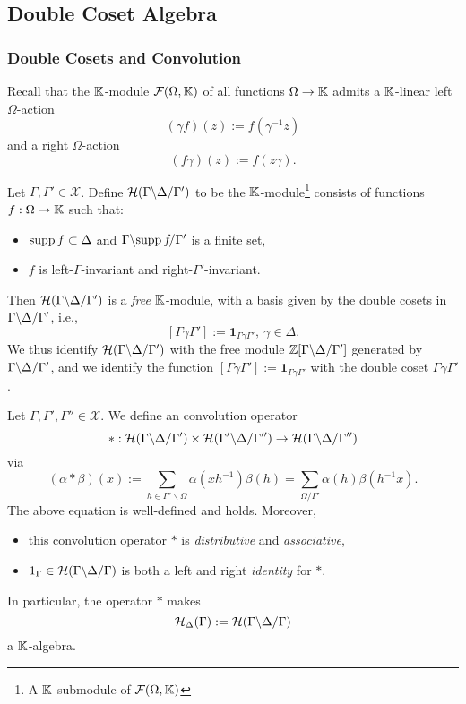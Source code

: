 \subsection{Double Coset Algebra}

\subsubsection{Double Cosets and Convolution}
Recall that the $\mathbb{K}$-module $\mathcal{F}(\Omega, \mathbb{K})$ of all functions $\Omega\to\mathbb{K}$ admits a $\mathbb{K}$-linear left $\Omega$-action\[(\gamma f)(z) := f(\gamma^{-1}z)\]
and a right $\Omega$-action \[(f\gamma)(z) := f(z\gamma).\]
\begin{defthm}
    Let $\Gamma, \Gamma'\in\mathscr{X}$. Define $\mathcal{H}({\Gamma}\backslash {\Delta}\slash {\Gamma'})$
    to be the $\mathbb{K}$-module\footnote{A $\mathbb{K}$-submodule of $\mathcal{F}(\Omega, \mathbb{K})$} consists of functions $f : \Omega\to\mathbb{K}$ such that:
    \begin{itemize}
        \item $\operatorname{supp} f\subset\Delta$ and ${\Gamma}\backslash {\operatorname{supp}f\!}\slash {\Gamma'}$ is a finite set,
        \item $f$ is left-$\Gamma$-invariant and right-$\Gamma'$-invariant.
    \end{itemize}
    Then $\mathcal{H}({\Gamma}\backslash {\Delta}\slash {\Gamma'})$ is a \textit{free} $\mathbb{K}$-module,
    with a basis given by the double cosets in ${\Gamma}\backslash {\Delta}\slash {\Gamma'}$, i.e., \[[\Gamma\gamma\Gamma'] := \boldsymbol{1}_{\Gamma\gamma\Gamma'},\ \gamma\in\Delta.\]
    We thus identify $\mathcal{H}({\Gamma}\backslash {\Delta}\slash {\Gamma'})$ with the free module $\mathbb{Z}[{\Gamma}\backslash {\Delta}\slash {\Gamma'}]$ generated by ${\Gamma}\backslash {\Delta}\slash {\Gamma'}$, and we identify the function $[\Gamma\gamma\Gamma'] := \boldsymbol{1}_{\Gamma\gamma\Gamma'}$ with the double coset $\Gamma\gamma\Gamma'$.
\end{defthm}

\begin{defthm}[Convolution]
    Let $\Gamma, \Gamma', \Gamma''\in\mathscr{X}$.
    We define an convolution operator \[* : \mathcal{H}({\Gamma}\backslash {\Delta}\slash {\Gamma'})\times\mathcal{H}({\Gamma'}\backslash {\Delta}\slash {\Gamma''})\to \mathcal{H}({\Gamma}\backslash {\Delta}\slash {\Gamma''})\]
    via \[(\alpha *\beta)(x) := \sum_{h\in\Gamma'\backslash\Omega} \alpha(xh^{-1})\beta(h) = \sum_{\Omega/\Gamma'}\alpha(h)\beta(h^{-1}x).\]
    The above equation is well-defined and holds.
    Moreover,\begin{itemize}
        \item this convolution operator $*$ is \textit{distributive} and \textit{associative},
        \item $1_{\Gamma}\in\mathcal{H}({\Gamma}\backslash {\Delta}\slash {\Gamma})$ is both a left and right \textit{identity} for $*$.
    \end{itemize}
    In particular, the operator $*$ makes \[\mathcal{H}_\Delta(\Gamma) := \mathcal{H}({\Gamma}\backslash {\Delta}\slash {\Gamma})\] a $\mathbb{K}$-algebra.
\end{defthm}


